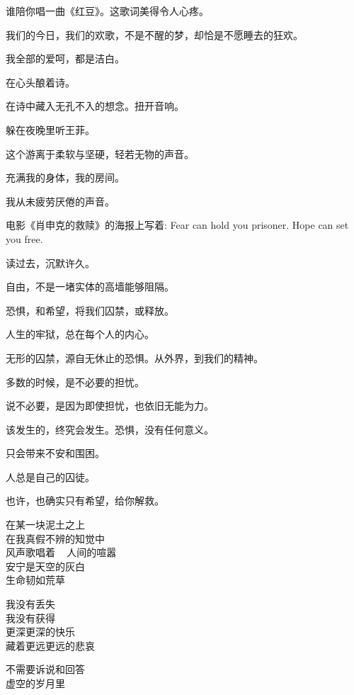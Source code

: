 		谁陪你唱一曲《红豆》。这歌词美得令人心疼。\par
		我们的今日，我们的欢歌，不是不醒的梦，却恰是不愿睡去的狂欢。\par
		我全部的爱呵，都是洁白。\par
		在心头酿着诗。\par
		在诗中藏入无孔不入的想念。扭开音响。\par
		躲在夜晚里听王菲。\par
		这个游离于柔软与坚硬，轻若无物的声音。\par
		充满我的身体，我的房间。

		我从未疲劳厌倦的声音。

	\endwriting



		电影《肖申克的救赎》的海报上写着: Fear can hold you prisoner. Hope can set you free.

		读过去，沉默许久。

		自由，不是一堵实体的高墙能够阻隔。

		恐惧，和希望，将我们囚禁，或释放。

		人生的牢狱，总在每个人的内心。

		无形的囚禁，源自无休止的恐惧。从外界，到我们的精神。

		多数的时候，是不必要的担忧。

		说不必要，是因为即使担忧，也依旧无能为力。

		该发生的，终究会发生。恐惧，没有任何意义。

		只会带来不安和围困。

		人总是自己的囚徒。

		也许，也确实只有希望，给你解救。

	\endwriting


	\longpoem{}{}{}

		在某一块泥土之上 \\
		在我真假不辨的知觉中 \\
		风声歌唱着 ~ 人间的喧嚣 \\
		安宁是天空的灰白 \\
		生命韧如荒草

		我没有丢失 \\
		我没有获得 \\
		更深更深的快乐 \\
		藏着更远更远的悲哀

		不需要诉说和回答 \\
		虚空的岁月里

